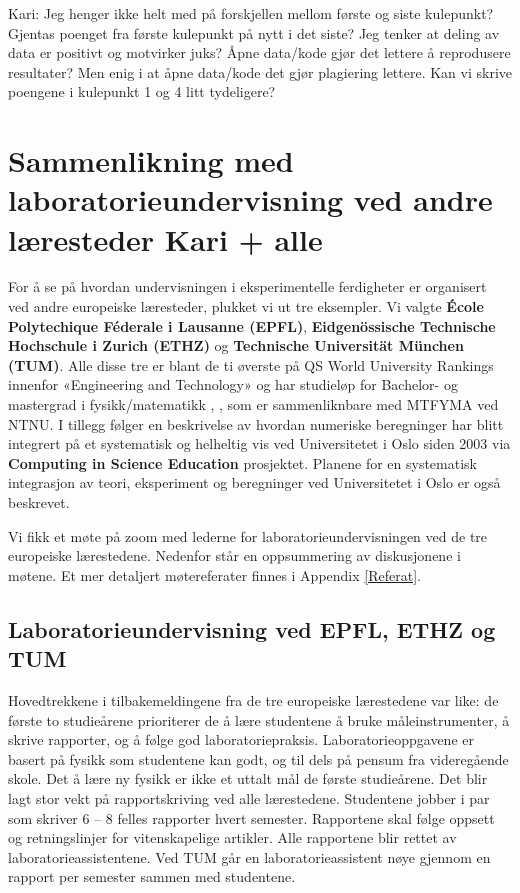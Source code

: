 \documentclass{article}
\begin{document}
\begin{itemize}
  {\color{red} Kari: Jeg henger ikke helt med på forskjellen mellom første og siste kulepunkt? Gjentas poenget fra første kulepunkt på nytt i det siste? Jeg tenker at deling av data er positivt og motvirker juks? Åpne data/kode gjør det lettere å reprodusere resultater? Men enig i at åpne data/kode det gjør plagiering lettere. Kan vi skrive poengene i kulepunkt 1 og 4 litt tydeligere? }
\end{itemize}

\section{Sammenlikning med laboratorieundervisning ved andre læresteder {\color{red} Kari + alle}}
For å se på hvordan undervisningen i eksperimentelle ferdigheter er organisert ved andre europeiske læresteder, plukket vi ut tre eksempler. Vi valgte {\bf École Polytechique Féderale i Lausanne (EPFL)}, {\bf Eidgenössische Technische Hochschule i Zurich (ETHZ)} og {\bf Technische Universität München (TUM)}. Alle disse tre er blant de ti øverste på QS World University Rankings innenfor «Engineering and Technology» og har studieløp for Bachelor- og mastergrad i fysikk/matematikk \cite{ETHZprog}, \cite{EPFLprog}, \cite{TUMprog} som er sammenliknbare med MTFYMA ved NTNU.  I tillegg følger en beskrivelse av hvordan numeriske beregninger har blitt integrert på et systematisk og helheltig vis ved Universitetet i Oslo siden 2003 via {\bf Computing in Science Education} prosjektet. Planene for en systematisk integrasjon av teori, eksperiment og beregninger ved Universitetet  i Oslo er også beskrevet.

Vi fikk et møte på zoom med lederne for laboratorieundervisningen ved de tre europeiske lærestedene. Nedenfor står en oppsummering av diskusjonene i møtene. Et mer detaljert møtereferater finnes i Appendix \ref{Referat}. 

\subsection{Laboratorieundervisning ved EPFL, ETHZ og TUM}

Hovedtrekkene i tilbakemeldingene fra de tre europeiske lærestedene var like: de første to studieårene prioriterer de å lære studentene å bruke måleinstrumenter, å skrive rapporter, og å følge god laboratoriepraksis. Laboratorieoppgavene er basert på fysikk som studentene kan godt, og til dels på pensum fra videregående skole. Det å lære ny fysikk er ikke et uttalt mål de første studieårene. Det blir lagt stor vekt på rapportskriving ved alle lærestedene. Studentene jobber i par som skriver 6 – 8 felles rapporter hvert semester. Rapportene skal følge oppsett og retningslinjer for vitenskapelige artikler. Alle rapportene blir rettet av laboratorieassistentene. Ved TUM går en laboratorieassistent nøye gjennom en rapport per semester sammen med studentene.
\end{document}
